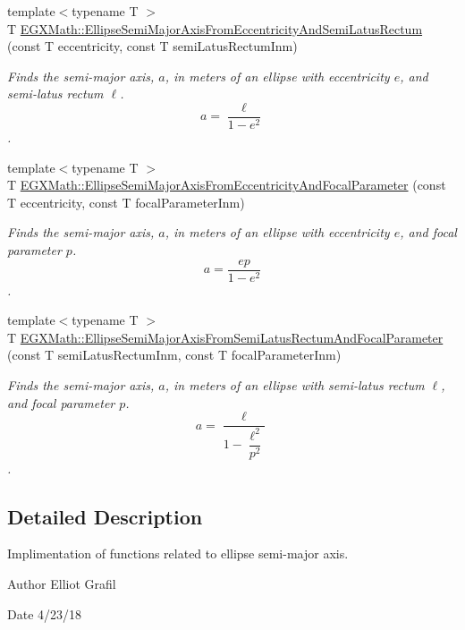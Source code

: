 \begin{DoxyCompactItemize}
{\footnotesize template$<$typename T $>$ }\\T \mbox{\hyperlink{group___e_g_x_math-_geometry-2_d-_ellipse-_semi_major_axis_ga00e19efce15b74c6556cbd5650d7f699}{E\+G\+X\+Math\+::\+Ellipse\+Semi\+Major\+Axis\+From\+Eccentricity\+And\+Semi\+Latus\+Rectum}} (const T eccentricity, const T semi\+Latus\+Rectum\+Inm)
\begin{DoxyCompactList}\small\item\em Finds the semi-\/major axis, $a$, in meters of an ellipse with eccentricity $e$, and semi-\/latus rectum $\ell$. \[ a=\dfrac{\ell}{1 - e^2} \]. \end{DoxyCompactList}\item 
{\footnotesize template$<$typename T $>$ }\\T \mbox{\hyperlink{group___e_g_x_math-_geometry-2_d-_ellipse-_semi_major_axis_ga77845ca288672da90567f533679e7024}{E\+G\+X\+Math\+::\+Ellipse\+Semi\+Major\+Axis\+From\+Eccentricity\+And\+Focal\+Parameter}} (const T eccentricity, const T focal\+Parameter\+Inm)
\begin{DoxyCompactList}\small\item\em Finds the semi-\/major axis, $a$, in meters of an ellipse with eccentricity $e$, and focal parameter $p$. \[ a=\dfrac{ep}{1-e^2} \]. \end{DoxyCompactList}\item 
{\footnotesize template$<$typename T $>$ }\\T \mbox{\hyperlink{group___e_g_x_math-_geometry-2_d-_ellipse-_semi_major_axis_gaea152a91fc8eb6532f497e9d25f0477c}{E\+G\+X\+Math\+::\+Ellipse\+Semi\+Major\+Axis\+From\+Semi\+Latus\+Rectum\+And\+Focal\+Parameter}} (const T semi\+Latus\+Rectum\+Inm, const T focal\+Parameter\+Inm)
\begin{DoxyCompactList}\small\item\em Finds the semi-\/major axis, $a$, in meters of an ellipse with semi-\/latus rectum $\ell$, and focal parameter $p$. \[ a=\dfrac{\ell}{1-\dfrac{\ell^2}{p^2}} \]. \end{DoxyCompactList}\end{DoxyCompactItemize}


\subsection{Detailed Description}
Implimentation of functions related to ellipse semi-\/major axis. 

\begin{DoxyAuthor}{Author}
Elliot Grafil 
\end{DoxyAuthor}
\begin{DoxyDate}{Date}
4/23/18 
\end{DoxyDate}
